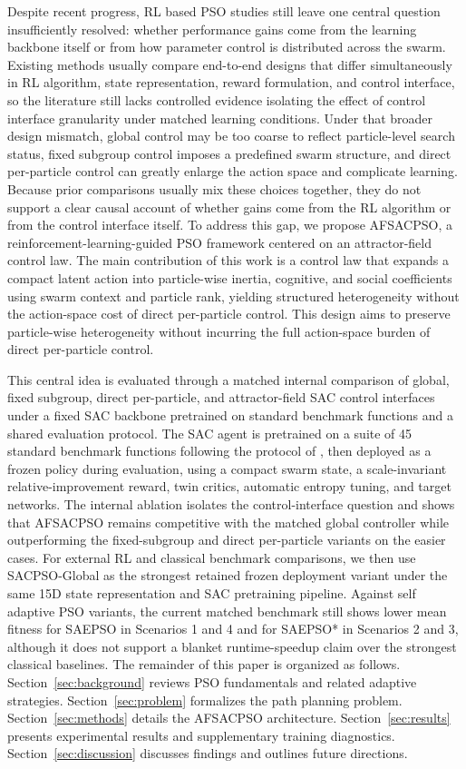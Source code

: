 \documentclass[final,5p,times]{elsarticle}
\begin{document}
Despite recent progress, RL based PSO studies still leave one central question insufficiently resolved: whether performance gains come from the learning backbone itself or from how parameter control is distributed across the swarm.
Existing methods usually compare end-to-end designs that differ simultaneously in RL algorithm, state representation, reward formulation, and control interface, so the literature still lacks controlled evidence isolating the effect of control interface granularity under matched learning conditions.
Under that broader design mismatch, global control may be too coarse to reflect particle-level search status, fixed subgroup control imposes a predefined swarm structure, and direct per-particle control can greatly enlarge the action space and complicate learning.
Because prior comparisons usually mix these choices together, they do not support a clear causal account of whether gains come from the RL algorithm or from the control interface itself.
To address this gap, we propose AFSACPSO, a reinforcement-learning-guided PSO framework centered on an attractor-field control law.
The main contribution of this work is a control law that expands a compact latent action into particle-wise inertia, cognitive, and social coefficients using swarm context and particle rank, yielding structured heterogeneity without the action-space cost of direct per-particle control.
This design aims to preserve particle-wise heterogeneity without incurring the full action-space burden of direct per-particle control.

This central idea is evaluated through a matched internal comparison of global, fixed subgroup, direct per-particle, and attractor-field SAC control interfaces under a fixed SAC backbone pretrained on standard benchmark functions and a shared evaluation protocol.
The SAC agent is pretrained on a suite of 45 standard benchmark functions following the protocol of \cite{vonEschwege2024Soft}, then deployed as a frozen policy during evaluation, using a compact swarm state, a scale-invariant relative-improvement reward, twin critics, automatic entropy tuning, and target networks.
The internal ablation isolates the control-interface question and shows that AFSACPSO remains competitive with the matched global controller while outperforming the fixed-subgroup and direct per-particle variants on the easier cases.
For external RL and classical benchmark comparisons, we then use SACPSO-Global as the strongest retained frozen deployment variant under the same 15D state representation and SAC pretraining pipeline.
Against self adaptive PSO variants, the current matched benchmark still shows lower mean fitness for SAEPSO in Scenarios 1 and 4 and for SAEPSO* in Scenarios 2 and 3, although it does not support a blanket runtime-speedup claim over the strongest classical baselines.
The remainder of this paper is organized as follows.
Section~\ref{sec:background} reviews PSO fundamentals and related adaptive strategies.
Section~\ref{sec:problem} formalizes the path planning problem.
Section~\ref{sec:methods} details the AFSACPSO architecture.
Section~\ref{sec:results} presents experimental results and supplementary training diagnostics.
Section~\ref{sec:discussion} discusses findings and outlines future directions.
\end{document}
